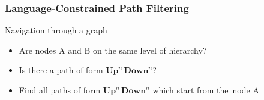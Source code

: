 \documentclass[xcolor=table]{beamer}
\begin{document}
\begin{frame}[fragile]
  \transwipe[direction=90]
  \frametitle{Language-Constrained Path Filtering}
  \begin{minipage}[m]{0.45\linewidth}
\end{minipage}\hfill
\begin{minipage}[m]{0.5\linewidth}
Navigation through a graph
\begin{itemize}
      \item Are nodes A and B on the same level of hierarchy?
      \item Is there a path of form $\textbf{Up}^n \, \textbf{Down}^n$?
      \item Find all paths of form $\textbf{Up}^n \, \textbf{Down}^n$ which start from the~node A
\end{itemize}

\end{minipage}

\end{frame}
\end{document}
